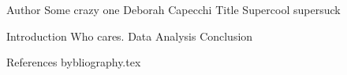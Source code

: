 Author 	Some crazy one Deborah Capecchi
Title	Supercool supersuck


Introduction Who cares.
Data
Analysis
Conclusion

References
bybliography.tex
